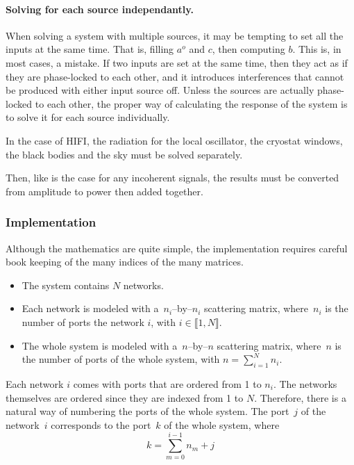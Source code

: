 \paragraph{Solving for each source independantly.}
When solving a system with multiple sources, it may be tempting to set all the inputs at the same time.
That is, filling $a^o$ and $c$, then computing $b$.
This is, in most cases, a mistake.
If two inputs are set at the same time, then they act as if they are phase-locked to each other, and it introduces interferences that cannot be produced with either input source off.
Unless the sources are actually phase-locked to each other, the proper way of calculating the response of the system is to solve it for each source individually.

In the case of HIFI, the radiation for the local oscillator, the cryostat windows, the black bodies and the sky must be solved separately.

Then, like is the case for any incoherent signals, the results must be converted from amplitude to power then added together.

\subsubsection{Implementation}
Although the mathematics are quite simple, the implementation requires careful book keeping of the many indices of the many matrices.

\begin{itemize}
    \item 
The system contains $N$ networks.
    \item 
Each network is modeled with a~$n_i$--by--$n_i$ scattering matrix, where~$n_i$ is the number of ports the network $i$, with $i \in \llbracket 1, N \rrbracket$.
    \item 
The whole system is modeled with a~$n$--by--$n$ scattering matrix, where~$n$ is the number of ports of the whole system, with $n = \sum_{i=1}^N n_i$.
\end{itemize}

Each network $i$ comes with ports that are ordered from 1 to $n_i$.
The networks themselves are ordered since they are indexed from 1 to $N$.
Therefore, there is a natural way of numbering the ports of the whole system.
The port~$j$ of the network~$i$ corresponds to the port~$k$ of the whole system, where
\begin{equation}
    k = \sum_{m=0}^{i - 1}n_m + j \label{eq:port_numbering}
\end{equation}

